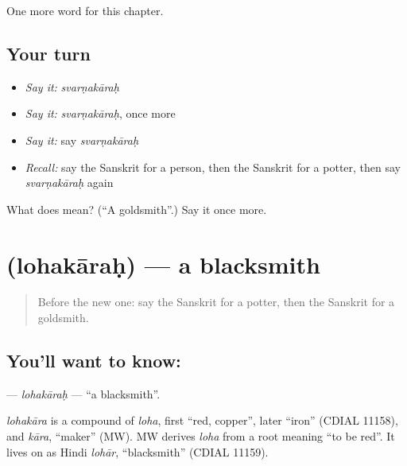 \begin{grammarlens}[title={What you've built}]
One more word for this chapter.
\end{grammarlens}

\subsection*{Your turn}
\begin{itemize}
\raggedright
  \item \emph{Say it:} \emph{svarṇakāraḥ}
  \item \emph{Say it:} \emph{svarṇakāraḥ}, once more
  \item \emph{Say it:} say \emph{svarṇakāraḥ}
  \item \emph{Recall:} say the Sanskrit for a person, then the Sanskrit for a potter, then say \emph{svarṇakāraḥ} again
\end{itemize}

\begin{tcolorbox}[breakable,colback=teal!4,colframe=teal!35!black,title={Before you move on}]
What does  mean? (\textquotedblleft{}A goldsmith\textquotedblright{}.) Say it once more.
\end{tcolorbox}
\section[\texorpdfstring{\sk{लोहकारः} (lohakāraḥ)}{लोहकारः (lohakāraḥ)}]{ (lohakāraḥ) — a blacksmith}

\label{lesson:SA-C237-lohakarah}



\begin{quote}
Before the new one: say the Sanskrit for a potter, then the Sanskrit for a goldsmith.
\end{quote}

\subsection*{You'll want to know: }
\textbf{} — \emph{lohakāraḥ} — \textquotedblleft{}a blacksmith\textquotedblright{}.

\begin{cousinweb}
\emph{lohakāra} is a compound of \emph{loha}, first \textquotedblleft{}red, copper\textquotedblright{}, later \textquotedblleft{}iron\textquotedblright{} (CDIAL 11158), and \emph{kāra}, \textquotedblleft{}maker\textquotedblright{} (MW). MW derives \emph{loha} from a root meaning \textquotedblleft{}to be red\textquotedblright{}. It lives on as Hindi \emph{lohār}, \textquotedblleft{}blacksmith\textquotedblright{} (CDIAL 11159).
\end{cousinweb}


